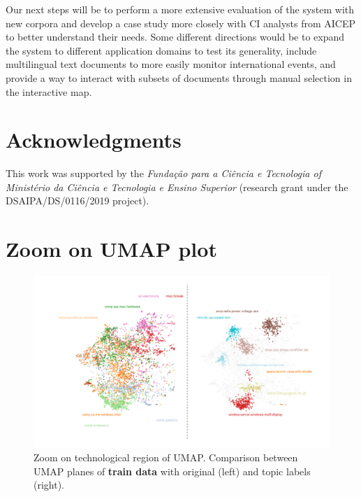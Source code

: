 \documentclass[a4paper]{article}
\begin{document}
Our next steps will be to perform a more extensive evaluation of the system with new corpora and develop a case study more closely with CI analysts from AICEP to better understand their needs. Some different directions would be to expand the system to different application domains to test its generality, include multilingual text documents to more easily monitor international events, and provide a way to interact with subsets of documents through manual selection in the interactive map.

\section*{Acknowledgments}
This work was supported by the \emph{Fundação para a Ciência e Tecnologia of Ministério da Ciência e Tecnologia e Ensino Superior} (research grant under the DSAIPA/DS/0116/2019 project).




\appendix
\section{Zoom on UMAP plot}
\begin{figure}[H]
	\centering
	\includegraphics[width=\linewidth]{./assets/umap_train_zoom_plots}
	\caption{Zoom on technological region of UMAP. Comparison between UMAP planes of \textbf{train data} with original (left) and topic labels (right).}
	\label{umap_train_plots_zoom}
\end{figure}
\end{document}
